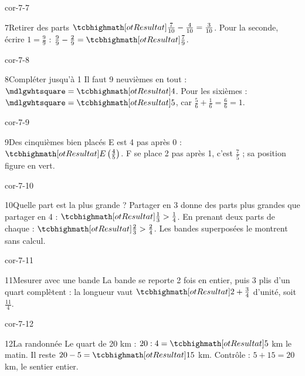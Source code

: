 \begin{blocLivre}{cor-7-7}\begin{corrige}{7}{Retirer des parts}
$\res{\frac7{10}-\frac4{10}=\frac3{10}}$. Pour la seconde, écrire $1=\frac99$ : $\frac99-\frac29=\res{\frac79}$.
\end{corrige}\end{blocLivre}
\begin{blocLivre}{cor-7-8}\begin{corrige}{8}{Compléter jusqu’à 1}
Il faut 9 neuvièmes en tout : $\square=\res4$. Pour les sixièmes : $\square=\res5$, car $\frac56+\frac16=\frac66=1$.
\end{corrige}\end{blocLivre}
\begin{blocLivre}{cor-7-9}\begin{corrige}{9}{Des cinquièmes bien placés}
E est 4 pas après 0 : $\res{E\left(\frac45\right)}$. F se place 2 pas après 1, c’est $\frac75$ ; sa position figure en vert.
\label{fig-cor-7-9}
\end{corrige}\end{blocLivre}
\begin{blocLivre}{cor-7-10}\begin{corrige}{10}{Quelle part est la plus grande ?}
Partager en 3 donne des parts plus grandes que partager en 4 : $\res{\frac13>\frac14}$. En prenant deux parts de chaque : $\res{\frac23>\frac24}$. Les bandes superposées le montrent sans calcul.
\label{fig-cor-7-10}
\end{corrige}\end{blocLivre}
\begin{blocLivre}{cor-7-11}\begin{corrige}{11}{Mesurer avec une bande}
La bande se reporte 2 fois en entier, puis 3 plis d’un quart complètent : la longueur vaut $\res{2+\frac34}$ d’unité, soit $\frac{11}4$.
\label{fig-cor-7-11}
\end{corrige}\end{blocLivre}
\begin{blocLivre}{cor-7-12}\begin{corrige}{12}{La randonnée}
Le quart de 20 km : $20:4=\res5$ km le matin. Il reste $20-5=\res{15}$ km. Contrôle : $5+15=20$ km, le sentier entier.
\end{corrige}\end{blocLivre}
